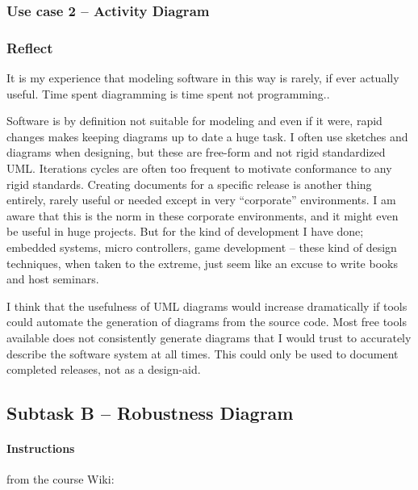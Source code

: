\subsubsection{Use case 2 -- Activity Diagram}\label{task-1a-usecase2activity}



\subsubsection{Reflect}\label{task-1a-reflect}
It is my experience that modeling software in this way is rarely, if ever
actually useful. Time spent diagramming is time spent not programming..

Software is by definition not suitable for modeling and even if it were, rapid
changes makes keeping diagrams up to date a huge task.  I often use sketches
and diagrams when designing, but these are free-form and not rigid standardized
UML. Iterations cycles are often too frequent to motivate conformance to any
rigid standards. Creating documents for a specific release is another thing
entirely, rarely useful or needed except in very ``corporate'' environments.  I
am aware that this is the norm in these corporate environments, and it might
even be useful in huge projects.  But for the kind of development I have done;
embedded systems, micro controllers, game development -- these kind of design
techniques, when taken to the extreme, just seem like an excuse to write books
and host seminars. \cite{use-case-critiques} \cite{use-case-critique}

I think that the usefulness of UML diagrams would increase dramatically if
tools could automate the generation of diagrams from the source code.  Most
free tools available does not consistently generate diagrams that I would trust
to accurately describe the software system at all times. This could only be
used to document completed releases, not as a design-aid.


\subsection{Subtask B -- Robustness Diagram}\label{task-1b}
\paragraph{Instructions}\label{task-1b-instructions}
from the course Wiki\cite{1dv600:lab2:instructions}:

